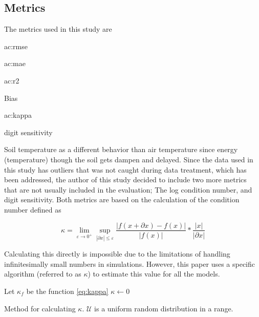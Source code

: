 \subsection{Metrics}\label{sec:method:metric}

The metrics used in this study are

\begin{itemize*}
	\item \acrfull{ac:rmse}
	\item \acrfull{ac:mae}
	\item \acrfull{ac:r2}
	\item Bias
	\item \acrfull{ac:kappa}
	\item digit sensitivity
\end{itemize*}

Soil temperature as a different behavior than air temperature since energy (temperature) though the soil gets dampen and delayed. Since the data used in this study has outliers that was not caught during data treatment, which has been addressed, the author of this study decided to include two more metrics that are not usually included in the evaluation; The log condition number, and digit sensitivity. Both metrics are based on the calculation of the condition number defined as 

\begin{equation}\label{eq:kappa}
\kappa = \lim\limits_{\varepsilon \to 0^+} \sup\limits_{|\partial x|\leq\varepsilon}  \frac{\left|f(x+\partial x) - f(x)\right|}{|f(x)|}*\frac{|x|}{|\partial x|} 
\end{equation}

Calculating this directly is impossible due to the limitations of handling infinitesimally small numbers in simulations. However, this paper uses a specific algorithm (referred to as $\kappa$) to estimate this value for all the models.

\begin{algorithm}[H]
	\SetAlgoLined
	Let $\kappa_f$ be the function \ref{eq:kappa}\;
	$\kappa\gets 0$\;
	\Return{$\kappa$}
	\caption[Randommised $\kappa$ algorithm]{Method for calculating $\kappa$. $\mathcal{U}$ is a uniform random distribution in a range.}
	\label{alg:cond_num}
\end{algorithm}

